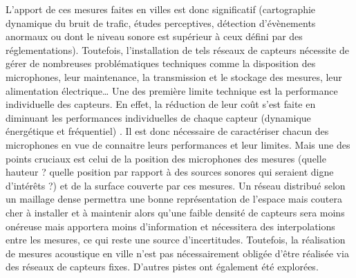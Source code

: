 L'apport de ces mesures faites en villes est donc significatif (cartographie dynamique du bruit de trafic, études perceptives, détection d'évènements anormaux ou dont le niveau sonore est supérieur à ceux défini par des réglementations). Toutefois, l'installation de tels réseaux de capteurs nécessite de gérer de nombreuses problématiques techniques comme la disposition des microphones, leur maintenance, la transmission et le stockage des mesures, leur alimentation électrique\dots{} Une des première limite technique est la performance individuelle des capteurs. En effet, la réduction de leur coût s'est faite en diminuant les performances  individuelles de chaque capteur (dynamique énergétique et fréquentiel) \cite{mydlarz2015design}. Il est donc nécessaire de caractériser chacun des microphones en vue de connaitre leurs performances et leur limites.
Mais une des points cruciaux est celui de la position des microphones des mesures (quelle hauteur ? quelle position par rapport à des sources sonores qui seraient digne d'intérêts ?) et de la surface couverte par ces mesures. Un réseau distribué selon un maillage dense permettra une bonne représentation de l'espace mais coutera cher à installer et à maintenir alors qu'une faible densité de capteurs sera moins onéreuse mais apportera moins d'information et nécessitera des interpolations entre les mesures, ce qui reste une source d'incertitudes.
Toutefois, la réalisation de mesures acoustique en ville n'est pas nécessairement obligée d'être réalisée via des réseaux de capteurs fixes. D'autres pistes ont également été explorées.

